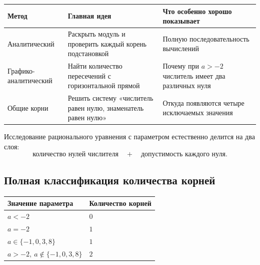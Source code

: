 \begin{center}
  \renewcommand{\arraystretch}{1.38}
  \begin{tabularx}{\textwidth}{
      >{\raggedright\arraybackslash}p{}
      >{\raggedright\arraybackslash}p{}
      >{\raggedright\arraybackslash}X
    }
    \toprule
    \rowcolor{TableHeader}
    Метод & Главная идея & Что особенно хорошо показывает \\
    \midrule
    Аналитический
      & Раскрыть модуль и проверить каждый корень подстановкой
      & Полную последовательность вычислений \\
    \addlinespace[0.25em]
    Графико-аналитический
      & Найти количество пересечений с горизонтальной прямой
      & Почему при \(a>-2\) числитель имеет два различных нуля \\
    \addlinespace[0.25em]
    Общие корни
      & Решить систему «числитель равен нулю, знаменатель равен нулю»
      & Откуда появляются четыре исключаемых значения \\
    \bottomrule
  \end{tabularx}
\end{center}

\begin{propertybox}
  Исследование рационального уравнения с параметром естественно делится на
  два слоя:
  \[
    \text{количество нулей числителя}
    \quad+\quad
    \text{допустимость каждого нуля}.
  \]
\end{propertybox}

\subsection{Полная классификация количества корней}

\begin{center}
  \renewcommand{\arraystretch}{1.38}
  \begin{tabularx}{\textwidth}{
      >{\centering\arraybackslash}p{}
      >{\centering\arraybackslash}X
    }
    \toprule
    \rowcolor{TableHeader}
    Значение параметра & Количество корней \\
    \midrule
    \(a<-2\) & \(0\) \\
    \(a=-2\) & \(1\) \\
    \(a\in\{-1,0,3,8\}\) & \(1\) \\
    \(a>-2,\ a\notin\{-1,0,3,8\}\) & \(2\) \\
    \bottomrule
  \end{tabularx}
\end{center}

